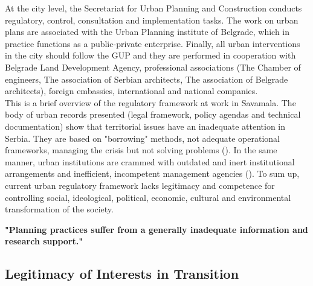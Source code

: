 \documentclass[11pt]{report}
\begin{document}
At the city level, the Secretariat for Urban Planning and Construction conducts regulatory, control, consultation and implementation tasks. The work on urban plans are associated with the Urban Planning institute of Belgrade, which in practice functions as a public-private enterprise. 
Finally, all urban interventions in the city should follow the GUP and they are performed in  cooperation  with  Belgrade Land Development Agency, professional  associations (The Chamber of engineers, The association of Serbian architects, The association of Belgrade architects), foreign  embassies, international and national companies.
\\
This is a brief overview of the regulatory framework at work in Savamala. 
The body of urban records presented (legal framework, policy agendas and technical documentation) show that territorial issues have an inadequate attention in Serbia.
They are based on "borrowing" methods, not adequate operational frameworks, managing the crisis but not solving problems
(\cite{adjustment of planning practice nedovic budic 2001, Vujosevic and Maricic 2012}).
In the same manner, urban institutions are crammed with outdated and inert institutional arrangements and inefficient, incompetent management agencies (\href{ref}{\citealt{vujosevic_conundrum_2012}}).
To sum up, current urban regulatory framework lacks legitimacy and competence for controlling social, ideological, political, economic, cultural and environmental transformation of the society.

\textbf{"Planning practices suffer from a generally inadequate information and research support." \cite{Vujosevic 2012}}

\subsection{Legitimacy of Interests in Transition}
\end{document}
